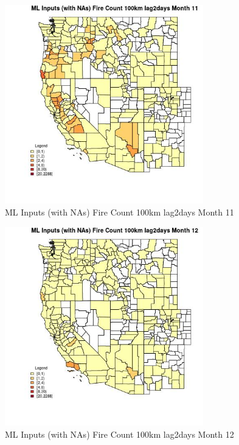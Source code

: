\clearpage 

\begin{figure} 
\centering  
\includegraphics[width=0.77\textwidth]{Code_Outputs/Report_ML_input_PM25_Step4_part_e_de_duplicated_aves_compiled_2019-05-20wNAs_CountyFire_Count_100km_lag2daysmedianMonth11.jpg} 
\caption{\label{fig:Report_ML_input_PM25_Step4_part_e_de_duplicated_aves_compiled_2019-05-20wNAsCountyFire_Count_100km_lag2daysmedianMonth11}ML Inputs (with NAs) Fire Count 100km lag2days Month 11} 
\end{figure} 
 

\begin{figure} 
\centering  
\includegraphics[width=0.77\textwidth]{Code_Outputs/Report_ML_input_PM25_Step4_part_e_de_duplicated_aves_compiled_2019-05-20wNAs_CountyFire_Count_100km_lag2daysmedianMonth12.jpg} 
\caption{\label{fig:Report_ML_input_PM25_Step4_part_e_de_duplicated_aves_compiled_2019-05-20wNAsCountyFire_Count_100km_lag2daysmedianMonth12}ML Inputs (with NAs) Fire Count 100km lag2days Month 12} 
\end{figure} 
 

